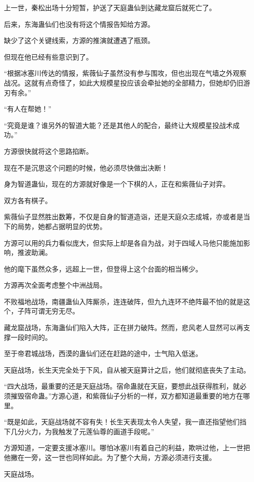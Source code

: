 \begin{this_body}
上一世，秦松出场十分短暂，护送了天庭蛊仙到达藏龙窟后就死亡了。

后来，东海蛊仙们也没有将这个情报告知给方源。

缺少了这个关键线索，方源的推演就遭遇了瓶颈。

但现在他已经有些意识到了。

“根据冰塞川传达的情报，紫薇仙子虽然没有参与围攻，但也出现在气墙之外观察战况。这就有点奇怪了，如此大规模星投应该会牵扯她的全部精力，但她却仍旧游刃有余。”

“有人在帮她！”

“究竟是谁？谁另外的智道大能？还是其他人的配合，最终让大规模星投战术成功。”

方源很快就将这个思路掐断。

现在不是沉思这个问题的时候，他必须尽快做出决断！

身为智道蛊仙，现在的方源就好像是一个下棋的人，正在和紫薇仙子对弈。

双方各有棋子。

紫薇仙子显然胜出数筹，不仅是自身的智道造诣，还是天庭众志成城，亦或者是当下的局势，她都占据明显的优势。

方源可以用的兵力看似庞大，但实际上却是各自为战，对于四域人马他只能施加影响，推波助澜。

他的麾下虽然众多，远超上一世，但登得上这个台面的相当稀少。

方源再次全面考虑整个中洲战局。

不败福地战场，南疆蛊仙入阵厮杀，连连破阵，但九九连环不绝阵最不怕的就是这个，子阵可谓无穷无尽。

藏龙窟战场，东海蛊仙们陷入大阵，正在拼力破阵。然而，悲风老人显然可以再支撑一段时间的。

至于帝君城战场，西漠的蛊仙们还在赶路的途中，士气陷入低迷。

天庭战场，长生天完全处于下风，自从被天庭算计之后，他们就彻底丧失了主动。

“四大战场，最重要的还是天庭战场。宿命蛊就在天庭，要想此战获得胜利，就必须摧毁宿命蛊。”方源心道，和紫薇仙子分析的一样，双方都知道最重要的地方在哪里。

“既是如此，天庭战场就不容有失！长生天表现太令人失望，我一直还指望他们挡下几分火力，为我触发了元莲仙尊的画道手段呢。”

方源知道，一定要支援冰塞川。哪怕冰塞川有着自己的利益，欺哄过他，上一世把他撇在一旁，这一世也同样如此。为了整个大局，方源必须进行支援。

天庭战场。


\end{this_body}
